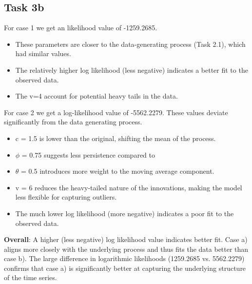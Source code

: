 \documentclass{article}
\begin{document}
\subsection{Task 3b}
For case 1 we get an likelihood value of -1259.2685. 
\begin{itemize}
    \item These parameters are closer to the data-generating process (Task 2.1), which had similar values.
    \item The relatively higher log likelihood (less negative) indicates a better fit to the observed data.
    \item The v=4 account for potential heavy tails in the data.
\end{itemize}
For case 2 we get a log-likelihood value of -5562.2279. These values deviate significantly from the data generating process.
\begin{itemize}
    \item c = 1.5 is lower than the original, shifting the mean of the process.
    \item $\phi$ = 0.75 suggests less persistence compared to
    \item$\theta$ = 0.5 introduces more weight to the moving average component.
    \item v = 6 reduces the heavy-tailed nature of the innovations, making the model less flexible for capturing outliers.
    \item The much lower log likelihood (more negative) indicates a poor fit to the observed data.
\end{itemize}
\textbf{Overall}: A higher (less negative) log likelihood value indicates better fit. Case a) aligns more closely with the underlying process and thus fits the data better than case b).
The large difference in logarithmic likelihoods (1259.2685 vs. 5562.2279) confirms that case a) is significantly better at capturing the underlying structure of the time series.
\end{document}
